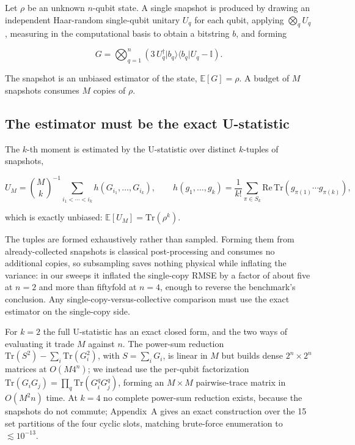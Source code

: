 \documentclass[a4paper,superscriptaddress,nofootinbib,onecolumn,nopdfoutputerror]{quantumarticle}
\begin{document}
Let \(\rho\) be an unknown \(n\)-qubit state. A single snapshot is
produced by drawing an independent Haar-random single-qubit unitary
\(U_q\) for each qubit, applying \(\bigotimes_q U_q\), measuring in the
computational basis to obtain a bitstring \(b\), and forming

\[G = \bigotimes_{q=1}^{n} \left( 3\, U_q^\dagger \lvert b_q \rangle \langle b_q \rvert U_q - \mathbb{I} \right).\]

The snapshot is an unbiased estimator of the state,
\(\mathbb{E}[G] = \rho\). A budget of \(M\) snapshots consumes \(M\)
copies of \(\rho\).

\hypertarget{the-estimator-must-be-the-exact-u-statistic}{%
\subsection{The estimator must be the exact
U-statistic}\label{the-estimator-must-be-the-exact-u-statistic}}

The \(k\)-th moment is estimated by the U-statistic over distinct
\(k\)-tuples of snapshots,

\[U_M = \binom{M}{k}^{-1} \sum_{i_1 < \cdots < i_k} h(G_{i_1}, \ldots, G_{i_k}), \qquad h(g_1, \ldots, g_k) = \frac{1}{k!} \sum_{\pi \in S_k} \mathrm{Re}\,\mathrm{Tr}\!\left( g_{\pi(1)} \cdots g_{\pi(k)} \right),\]

which is exactly unbiased: \(\mathbb{E}[U_M] = \mathrm{Tr}(\rho^k)\).

The tuples are formed exhaustively rather than sampled. Forming them from
already-collected snapshots is classical post-processing and consumes no
additional copies, so subsampling saves nothing physical while inflating
the variance: in our sweeps it inflated the single-copy RMSE by a
factor of about five at \(n = 2\) and more than fiftyfold at \(n = 4\),
enough to reverse the benchmark's conclusion. Any
single-copy-versus-collective comparison must use the exact estimator on
the single-copy side.

For \(k = 2\) the full U-statistic has an exact closed form, and the two
ways of evaluating it trade \(M\) against \(n\). The power-sum reduction
\(\mathrm{Tr}(S^2) - \sum_i \mathrm{Tr}(G_i^2)\), with \(S = \sum_i G_i\),
is linear in \(M\) but builds dense \(2^n \times 2^n\) matrices at
\(O(M 4^n)\); we instead use
the per-qubit factorization
\(\mathrm{Tr}(G_i G_j) = \prod_q \mathrm{Tr}(G_i^q G_j^q)\), forming an
\(M \times M\) pairwise-trace matrix in \(O(M^2 n)\) time. At \(k = 4\) no
complete power-sum reduction exists, because the snapshots do not commute;
Appendix~A gives an exact construction over the 15 set partitions of the four
cyclic slots, matching brute-force enumeration to \(\lesssim 10^{-13}\).
\end{document}
